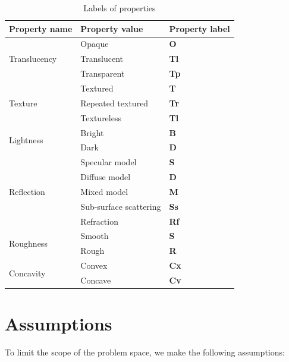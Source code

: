 \begin{table}[!htbp]
\centering
\begin{tabular}{l | ll}
\toprule
Property name & Property value & Property label \\
\midrule
\multirow{3}{*}{Translucency} & Opaque & \textbf{O} \\
							  & Translucent & \textbf{Tl} \\
							  & Transparent & \textbf{Tp} \\ \cline{2-3}
\multirow{3}{*}{Texture} & Textured & \textbf{T} \\
						 & Repeated textured & \textbf{Tr} \\
						 & Textureless & \textbf{Tl} \\ \cline{2-3}
\multirow{2}{*}{Lightness} & Bright & \textbf{B} \\
						   & Dark 	& \textbf{D} \\ \cline{2-3}
\multirow{5}{*}{Reflection} & Specular model & \textbf{S} \\
							& Diffuse model  & \textbf{D} \\
							& Mixed model	 & \textbf{M} \\
							& Sub-surface scattering & \textbf{Ss} \\
							& Refraction 	 & \textbf{Rf} \\ \cline{2-3}
\multirow{2}{*}{Roughness} & Smooth & \textbf{S} \\
						   & Rough 	& \textbf{R} \\ \cline{2-3}
\multirow{2}{*}{Concavity} & Convex  & \textbf{Cx} \\
						   & Concave & \textbf{Cv} \\
\bottomrule
\end{tabular}
\caption{Labels of properties}
\label{tab:prop_label}
\end{table}

\section{Assumptions}
\label{sec:assumptions}
To limit the scope of the problem space, we make the following assumptions:

